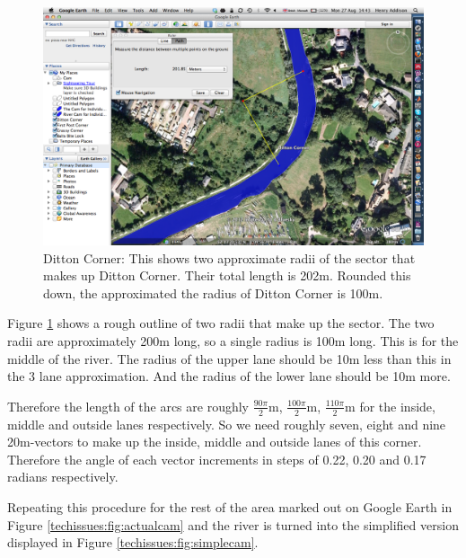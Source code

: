       \begin{figure}
      \begin{center}
        \includegraphics[scale=0.3]{images/DittonCornerRadius.png}
        \caption{Ditton Corner: This shows two approximate radii of the sector that makes up Ditton Corner. Their total length is 202m. Rounded this down, the approximated the radius of Ditton Corner is 100m.}
        \label{fig:dittoncorner:radius}
      \end{center}
      \end{figure}
      
      Figure \ref{fig:dittoncorner:radius} shows a rough outline of two radii that make up the sector. The two radii are approximately 200m long, so a single radius is 100m long. This is for the middle of the river. The radius of the upper lane should be 10m less than this in the 3 lane approximation. And the radius of the lower lane should be 10m more.
      
      Therefore the length of the arcs are roughly $\frac{90\pi}{2}$m, $\frac{100\pi}{2}$m, $\frac{110\pi}{2}$m for the inside, middle and outside lanes respectively. So we need roughly seven, eight and nine 20m-vectors to make up the inside, middle and outside lanes of this corner. Therefore the angle of each vector increments in steps of 0.22, 0.20 and 0.17 radians respectively.
      
      Repeating this procedure for the rest of the area marked out on Google Earth in Figure \ref{techissues:fig:actualcam} and the river is turned into the simplified version displayed in Figure \ref{techissues:fig:simplecam}.
      
